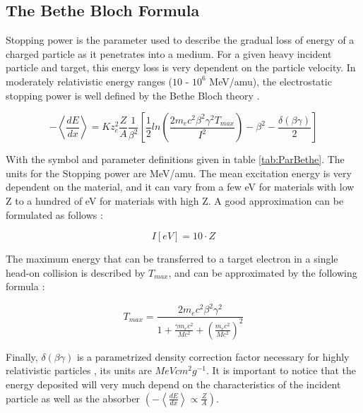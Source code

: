 \subsection{The Bethe Bloch Formula}
\label{sec:Bethe}

Stopping power is the parameter used to describe the gradual loss of energy of a charged particle as it penetrates into a medium. For a given heavy incident particle and target, this energy loss is very dependent on the particle velocity. In moderately relativistic energy ranges ($10$ - $10^6$ \si[]{\mega \electronvolt}/amu), the electrostatic stopping power is well defined by the Bethe Bloch theory \parencite[]{ref:Bethe}. 

\begin{equation}
    - \left< \frac{dE}{dx} \right> = Kz^2_e\frac{Z}{A}\frac{1}{\beta^2}\left[ \frac{1}{2} ln \left( \frac{2m_e c^2 \beta^2 \gamma^2 T_{max}}{I^2}\right) -\beta^2 - \frac{\delta\left(\beta \gamma\right)}{2} \right]
    \label{eq:bethe}
\end{equation}

With the symbol and parameter definitions given in table \ref{tab:ParBethe}. The units for the Stopping power are \si[]{\mega \electronvolt}/amu. The mean excitation energy is very dependent on the material, and it can vary from a few \si[]{\electronvolt} for materials with low Z to a hundred of \si[]{\electronvolt} for materials with high Z. A good approximation can be formulated as follows \parencite*[][]{ref:IonizationEne}:

\begin{equation}
    I \left[ eV \right] = 10 \cdot Z 
    \label{eq:ionizationEnergy}
\end{equation}

The maximum energy that can be transferred to a target electron in a single head-on collision is described by $T_{max}$, and can be approximated by the following formula \parencite*[][]{ref:TmaxFormula}: 

\begin{equation}
    T_{max} = \frac{2m_e c^2 \beta^2 \gamma^2}{1+\frac{\gamma m_e c^2}{M c^2}+\left( \frac{m_e c^2}{M c^2} \right)^2}
    \label{eq:tmax}
\end{equation}

Finally, $\delta (\beta \gamma)$ is a parametrized density correction factor necessary for highly relativistic particles \parencite*[][]{ref:Bethe}, its units are $MeV cm^2 g^{-1}$. It is important to notice that the energy deposited will very much depend on the characteristics of the incident particle as well as the absorber $\left( -\left< \frac{dE}{dx} \right> \propto \frac{Z}{A}  \right)$. 

